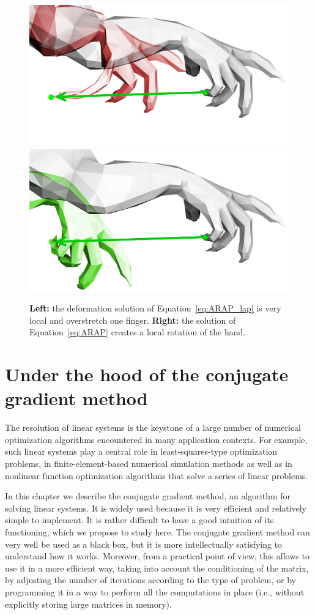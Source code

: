 \documentclass[notitlepage,oneside]{book}
\makeatletter
\newcommand{\authoredby}[1]{\addtocontents{toc}{\protect\@nameuse{authoredby#1}}}%
\makeatother
\begin{document}
\begin{figure}[h]
 \centering
 \includegraphics[width=0.35\linewidth]{arap-lap-a.jpg}
 \includegraphics[width=0.35\linewidth]{arap-lap-b.jpg}
 \caption{\textbf{Left:} the deformation solution of Equation~\eqref{eq:ARAP_lap} is very local and overstretch one finger. \textbf{Right:} the solution of Equation~\eqref{eq:ARAP} creates a local rotation of the hand.}
\label{fig:arap-lap}
\end{figure}



\authoredby{A}
\chapter{Under the hood of the conjugate gradient method}
\fancyhead[R]{\textcolor{red}{optional for reading}}


The resolution of linear systems is the keystone of a large number of numerical optimization algorithms encountered in many application contexts.
For example, such linear systems play a central role in least-squares-type optimization problems, in
finite-element-based numerical simulation methods as well as in nonlinear function optimization algorithms that solve a series of linear problems.

In this chapter we describe the conjugate gradient method, an algorithm for solving linear systems.
It is widely used because it is very efficient and relatively simple to implement.
It is rather difficult to have a good intuition of its functioning, which we propose to study here.
The conjugate gradient method can very well be used as a black box, but it is more intellectually satisfying to understand how it works.
Moreover, from a practical point of view, this allows to use it in a more efficient way, taking into account the conditioning of the matrix,
by adjusting the number of iterations according to the type of problem, or by programming it in a way to perform all the computations in place
(i.e., without explicitly storing large matrices in memory).
\end{document}
